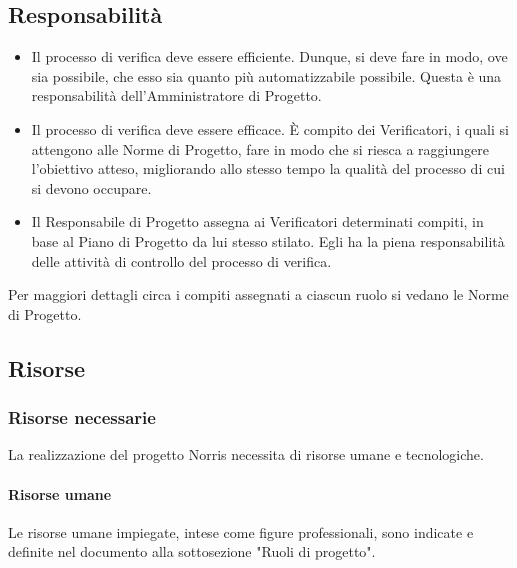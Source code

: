 	\subsection{Responsabilità}
		\begin{itemize}
			\item Il processo di verifica deve essere efficiente. Dunque, si deve fare in modo, ove sia possibile, che esso sia quanto più automatizzabile 
			possibile. Questa è una responsabilità dell'Amministratore di Progetto.
			\item Il processo di verifica deve essere efficace. È compito dei Verificatori, i quali si attengono alle Norme di Progetto, fare in modo che 
			si riesca a raggiungere l'obiettivo atteso, migliorando allo stesso tempo la qualità del processo di cui si devono occupare.
			\item Il Responsabile di Progetto assegna ai Verificatori determinati compiti, in base al Piano di Progetto da lui stesso stilato. Egli ha la 
			piena responsabilità delle attività di controllo del processo di verifica.
		\end{itemize}
		Per maggiori dettagli circa i compiti assegnati a ciascun ruolo si vedano le Norme di Progetto.
	\subsection{Risorse}
	\subsubsection{Risorse necessarie}
	La realizzazione del progetto Norris necessita di risorse umane e tecnologiche.
	\paragraph{Risorse umane}
		Le risorse umane impiegate, intese come figure professionali, sono indicate e definite nel documento  alla sottosezione "Ruoli di progetto".
